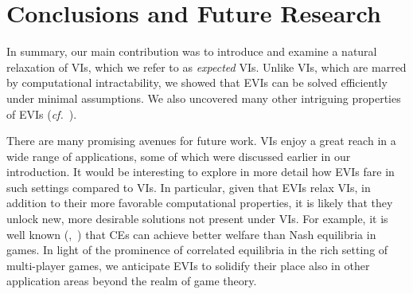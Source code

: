 \section{Conclusions and Future Research}

In summary, our main contribution was to introduce and examine a natural relaxation of VIs, which we refer to as \emph{expected} VIs. Unlike VIs, which are marred by computational intractability, we showed that EVIs can be solved efficiently under minimal assumptions. We also uncovered many other intriguing properties of EVIs (\emph{cf.}~).

There are many promising avenues for future work. VIs enjoy a great reach in a wide range of applications, some of which were discussed earlier in our introduction. It would be interesting to explore in more detail how EVIs fare in such settings compared to VIs. In particular, given that EVIs relax VIs, in addition to their more favorable computational properties, it is likely that they unlock new, more desirable solutions not present under VIs. 
For example, it is well known (\eg,~\citealp{Ashlagi05:Value}) that CEs can achieve better welfare than Nash equilibria in games. In light of the prominence of correlated equilibria in the rich setting of multi-player games, we anticipate EVIs to solidify their place also in other application areas beyond the realm of game theory.
